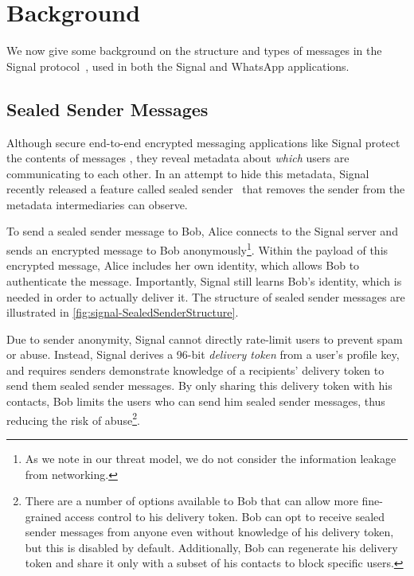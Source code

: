 \section{Background}\label{sec:Signal-background}


We now give
some background on the structure and types of messages in the Signal protocol~\cite{Mar13}, used in both the Signal and WhatsApp applications.

\subsection{Sealed Sender Messages} %
\label{ssec:signal-signal}
Although %
secure end-to-end encrypted messaging %
applications like Signal protect the
contents of messages%
, they reveal metadata about
\emph{which} users are communicating to each other. In an attempt to hide this
metadata, Signal recently released a feature called sealed
sender~\cite{sealed-sender} that removes the sender from the metadata
intermediaries can observe.

To send a sealed sender message to Bob, Alice connects to the Signal server and
sends an encrypted message to Bob anonymously\footnote{As we note in our threat
model, we do not consider the information leakage from networking.}. Within the
payload of this encrypted message, Alice includes her own identity, which allows
Bob to authenticate the message.  Importantly, Signal still learns Bob's
identity, which is needed in order to actually deliver it. %
The structure of sealed sender messages are illustrated in \cref{fig:signal-SealedSenderStructure}.

Due to sender anonymity,
Signal cannot directly rate-limit users to prevent spam or abuse.  Instead,
Signal derives a 96-bit \emph{delivery token} from a user's profile key, and
requires senders demonstrate knowledge of a recipients' delivery token to send
them sealed sender messages.
By only sharing this delivery token with his contacts, Bob
limits the users who can send him sealed
sender messages, thus reducing the risk of abuse\footnote{There are a number of
options available to Bob that can allow more fine-grained access control to his
delivery token.  Bob can opt to receive sealed sender messages from anyone even
without knowledge of his delivery token, but this is disabled by default.
Additionally, Bob can regenerate his delivery token and share it only with a
subset of his contacts to block specific users.}.

